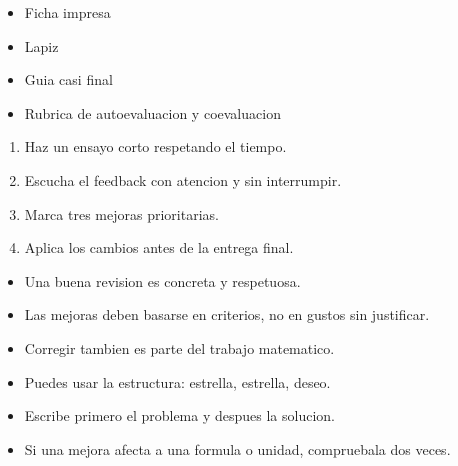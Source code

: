 \documentclass[12pt,a4paper]{article}
\begin{document}
        \FichaCabecera

        \begin{materialesbox}
        \begin{itemize}
    \item Ficha impresa
    \item Lapiz
    \item Guia casi final
    \item Rubrica de autoevaluacion y coevaluacion
\end{itemize}
        \end{materialesbox}

        \begin{pasosbox}
        \begin{enumerate}
    \item Haz un ensayo corto respetando el tiempo.
    \item Escucha el feedback con atencion y sin interrumpir.
    \item Marca tres mejoras prioritarias.
    \item Aplica los cambios antes de la entrega final.
\end{enumerate}
        \end{pasosbox}

        \begin{recordatoriobox}
        \begin{itemize}
    \item Una buena revision es concreta y respetuosa.
    \item Las mejoras deben basarse en criterios, no en gustos sin justificar.
    \item Corregir tambien es parte del trabajo matematico.
\end{itemize}
        \end{recordatoriobox}

        \begin{apoyobox}
        \begin{itemize}
    \item Puedes usar la estructura: estrella, estrella, deseo.
    \item Escribe primero el problema y despues la solucion.
    \item Si una mejora afecta a una formula o unidad, compruebala dos veces.
\end{itemize}
        \end{apoyobox}

\end{document}
